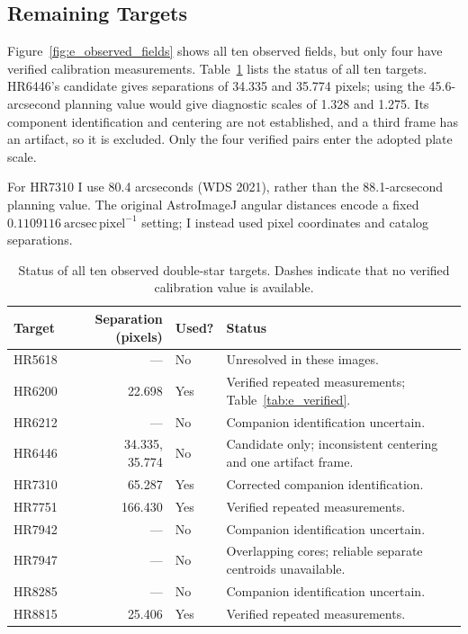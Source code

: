 \documentclass[12pt,letterpaper,twocolumn]{article}
\begin{document}
\subsection{Remaining Targets}
Figure~\ref{fig:e_observed_fields} shows all ten observed fields, but only four have verified calibration
measurements. Table~\ref{tab:e_status} lists the status of all ten targets.
HR6446's candidate gives separations of 34.335 and 35.774 pixels;
using the 45.6-arcsecond planning value would give diagnostic scales
of 1.328 and 1.275. Its component identification and centering are
not established, and a third frame has an artifact, so it is excluded.
Only the four verified pairs enter the adopted plate scale.

For HR7310 I use 80.4 arcseconds (WDS 2021), rather than the
88.1-arcsecond planning value. The original AstroImageJ angular
distances encode a fixed $0.1109116~\mathrm{arcsec\,pixel^{-1}}$
setting; I instead used pixel coordinates and catalog separations.
\begin{table}[tp]\centering\small
\caption{Status of all ten observed double-star targets. Dashes indicate that no verified calibration value is available.}\label{tab:e_status}
\begin{tabularx}{\textwidth}{@{}lrlX@{}}\toprule
Target & Separation (pixels) & Used? & Status\\\midrule
HR5618 & --- & No & Unresolved in these images.\\
HR6200 & 22.698 & Yes & Verified repeated measurements; Table~\ref{tab:e_verified}.\\
HR6212 & --- & No & Companion identification uncertain.\\
HR6446 & \makecell[r]{34.335,\\35.774} & No & Candidate only; inconsistent centering and one artifact frame.\\
HR7310 & 65.287 & Yes & Corrected companion identification.\\
HR7751 & 166.430 & Yes & Verified repeated measurements.\\
HR7942 & --- & No & Companion identification uncertain.\\
HR7947 & --- & No & Overlapping cores; reliable separate centroids unavailable.\\
HR8285 & --- & No & Companion identification uncertain.\\
HR8815 & 25.406 & Yes & Verified repeated measurements.\\\bottomrule
\end{tabularx}\end{table}
\end{document}

